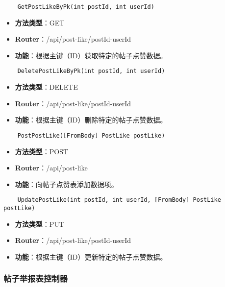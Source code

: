 \begin{verbatim}
	GetPostLikeByPk(int postId, int userId)
\end{verbatim}

\begin{itemize}
	\item \textbf{方法类型}：GET
	\item \textbf{Router}：/api/post-like/{postId}-{userId}
	\item \textbf{功能}：根据主键（ID）获取特定的帖子点赞数据。
\end{itemize}

\begin{verbatim}
	DeletePostLikeByPk(int postId, int userId)
\end{verbatim}

\begin{itemize}
	\item \textbf{方法类型}：DELETE
	\item \textbf{Router}：/api/post-like/{postId}-{userId}
	\item \textbf{功能}：根据主键（ID）删除特定的帖子点赞数据。
\end{itemize}

\begin{verbatim}
	PostPostLike([FromBody] PostLike postLike)
\end{verbatim}

\begin{itemize}
	\item \textbf{方法类型}：POST
	\item \textbf{Router}：/api/post-like
	\item \textbf{功能}：向帖子点赞表添加数据项。
\end{itemize}

\begin{verbatim}
	UpdatePostLike(int postId, int userId, [FromBody] PostLike postLike)
\end{verbatim}

\begin{itemize}
	\item \textbf{方法类型}：PUT
	\item \textbf{Router}：/api/post-like/{postId}-{userId}
	\item \textbf{功能}：根据主键（ID）更新特定的帖子点赞数据。
\end{itemize}

\subsubsection{帖子举报表控制器}

